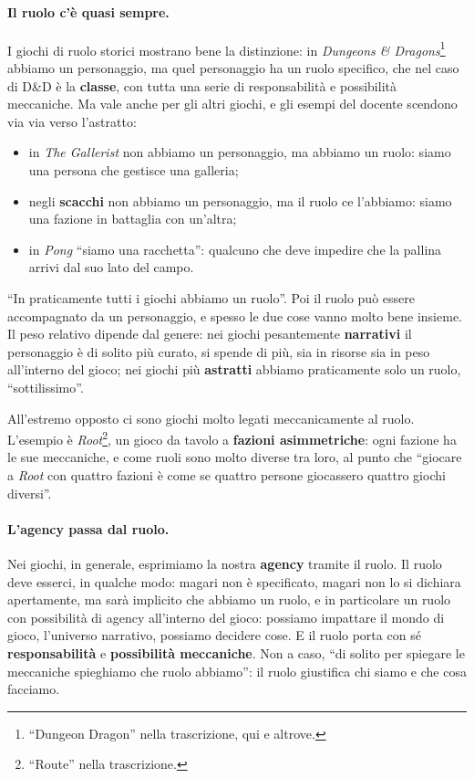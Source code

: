 \paragraph{Il ruolo c'è quasi sempre.} I giochi di ruolo storici mostrano bene la
distinzione: in \emph{Dungeons \& Dragons}\footnote{``Dungeon Dragon'' nella
trascrizione, qui e altrove.} abbiamo un personaggio, ma quel personaggio ha un
ruolo specifico, che nel caso di D\&D è la \textbf{classe}, con tutta una serie di
responsabilità e possibilità meccaniche. Ma vale anche per gli altri giochi, e
gli esempi del docente scendono via via verso l'astratto:
\begin{itemize}
  \item in \emph{The Gallerist} non abbiamo un personaggio, ma abbiamo un ruolo:
        siamo una persona che gestisce una galleria;
  \item negli \textbf{scacchi} non abbiamo un personaggio, ma il ruolo ce
        l'abbiamo: siamo una fazione in battaglia con un'altra;
  \item in \emph{Pong} ``siamo una racchetta'': qualcuno che deve impedire che la
        pallina arrivi dal suo lato del campo.
\end{itemize}
``In praticamente tutti i giochi abbiamo un ruolo''. Poi il ruolo può essere
accompagnato da un personaggio, e spesso le due cose vanno molto bene insieme. Il
peso relativo dipende dal genere: nei giochi pesantemente \textbf{narrativi} il
personaggio è di solito più curato, si spende di più, sia in risorse sia in peso
all'interno del gioco; nei giochi più \textbf{astratti} abbiamo praticamente solo
un ruolo, ``sottilissimo''.

All'estremo opposto ci sono giochi molto legati meccanicamente al ruolo. L'esempio
è \emph{Root}\footnote{``Route'' nella trascrizione.}, un gioco da tavolo a
\textbf{fazioni asimmetriche}: ogni fazione ha le sue meccaniche, e come ruoli
sono molto diverse tra loro, al punto che ``giocare a \emph{Root} con quattro
fazioni è come se quattro persone giocassero quattro giochi diversi''.

\paragraph{L'agency passa dal ruolo.} Nei giochi, in generale, esprimiamo la nostra
\textbf{agency} tramite il ruolo. Il ruolo deve esserci, in qualche modo: magari
non è specificato, magari non lo si dichiara apertamente, ma sarà implicito che
abbiamo un ruolo, e in particolare un ruolo con possibilità di agency
all'interno del gioco: possiamo impattare il mondo di gioco, l'universo narrativo,
possiamo decidere cose. E il ruolo porta con sé \textbf{responsabilità} e
\textbf{possibilità meccaniche}. Non a caso, ``di solito per spiegare le
meccaniche spieghiamo che ruolo abbiamo'': il ruolo giustifica chi siamo e che
cosa facciamo.

